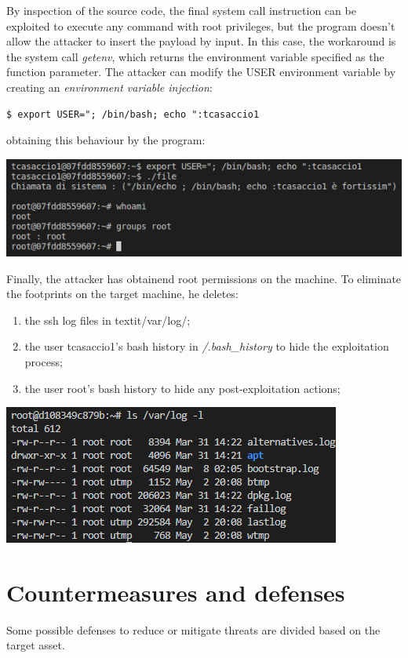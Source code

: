 \documentclass[a4paper, 12pt, oneside]{extbook}
\begin{document}
By inspection of the source code, the final system call instruction can be exploited to 
execute any command with root privileges, but the program doesn't allow the attacker to insert the 
payload by input. In this case, the workaround is the system call \textit{getenv}, which returns the environment 
variable specified as the function parameter. The attacker can modify the USER environment variable 
by creating an \textit{environment variable injection}:
\begin{lstlisting}[style=DOS]
$ export USER="; /bin/bash; echo ":tcasaccio1
\end{lstlisting}
obtaining this behaviour by the program:
\begin{center}
  \includegraphics[scale=0.9]{../Image/privilege_escalation_exploit.PNG}
\end{center}
Finally, the attacker has obtainend root permissions on the machine.
To eliminate the footprints on the target machine, he deletes:
\begin{enumerate}
  \item the ssh log files in textit{/var/log/};
  \item the user tcasaccio1's bash history in \textit{/.bash\_history} to hide the exploitation process;
  \item the user root's bash history to hide any post-exploitation actions;
 \end{enumerate}

 \begin{center}
  \includegraphics[scale=0.9]{../Image/elimination_traces.PNG}
\end{center}


\chapter{Countermeasures and defenses}
Some possible defenses to reduce or mitigate threats are divided based on the target asset.
\end{document}
